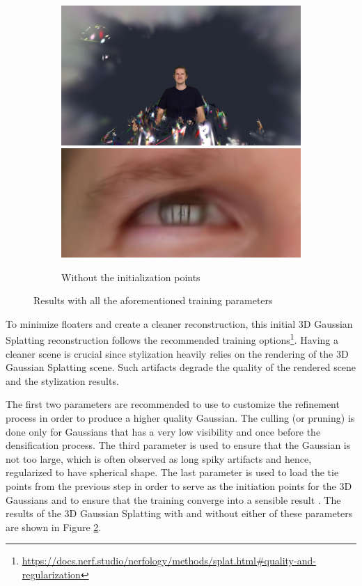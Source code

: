 \begin{figure}[ht]
\begin{subfigure}{0.48\linewidth}
		\includegraphics[width=\textwidth]{Figures/methods/splatfacto_methods/no_init_points.png}
		\includegraphics[width=\textwidth]{Figures/methods/splatfacto_methods/eyes_no_points.png}
		\caption{Without the initialization points}
		\label{fig:3dsplatting-without-points}
	\end{subfigure}
	\caption{Results with all the aforementioned training parameters}
	\label{fig:3dsplatting}
\end{figure}


To minimize floaters and create a cleaner reconstruction, this initial 3D Gaussian Splatting reconstruction follows the recommended training options\footnote{\url{https://docs.nerf.studio/nerfology/methods/splat.html\#quality-and-regularization}}. Having a cleaner scene is crucial since stylization heavily relies on the rendering of the 3D Gaussian Splatting scene. Such artifacts degrade the quality of the rendered scene and the stylization results.

The first two parameters are recommended to use to customize the refinement process in order to produce a higher quality Gaussian. The culling (or pruning) is done only for Gaussians that has a very low visibility and once before the densification process. The third parameter is used to ensure that the Gaussian is not too large, which is often observed as long spiky artifacts and hence, regularized to have spherical shape. The last parameter is used to load the tie points from the previous step in order to serve as the initiation points for the 3D Gaussians and to ensure that the training converge into a sensible result . The results of the 3D Gaussian Splatting with and without either of these parameters are shown in Figure \ref{fig:3dsplatting}.

